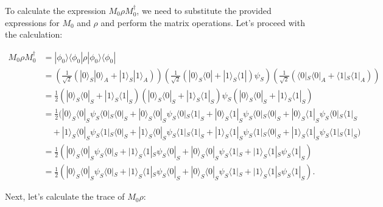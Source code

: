\documentclass{article}
\begin{document}
To calculate the expression $M_0\rho M_0^\dagger$, we need to substitute the provided expressions for $M_0$ and $\rho$ and perform the matrix operations. Let's proceed with the calculation:

\begin{align*}
    M_0\rho M_0^\dagger & = |\phi_0\rangle\langle\phi_0|\rho|\phi_0\rangle\langle\phi_0|                                                                                                                                                                                         \\
                        & = \left(\frac{1}{\sqrt{2}}(|0\rangle_S|0\rangle_A + |1\rangle_S|1\rangle_A)\right) \left(\frac{1}{\sqrt{2}}(|0\rangle_S\langle0| + |1\rangle_S\langle1|)\psi_S\right) \left(\frac{1}{\sqrt{2}}(\langle0|_S\langle0|_A + \langle1|_S\langle1|_A)\right) \\
                        & = \frac{1}{2}(|0\rangle_S\langle0|_S + |1\rangle_S\langle1|_S)(|0\rangle_S\langle0|_S + |1\rangle_S\langle1|_S)\psi_S(|0\rangle_S\langle0|_S + |1\rangle_S\langle1|_S)                                                                                 \\
                        & = \frac{1}{2}(|0\rangle_S\langle0|_S\psi_S\langle0|_S\langle0|_S + |0\rangle_S\langle0|_S\psi_S\langle0|_S\langle1|_S + |0\rangle_S\langle1|_S\psi_S\langle0|_S\langle0|_S + |0\rangle_S\langle1|_S\psi_S\langle0|_S\langle1|_S                        \\
                        & \quad + |1\rangle_S\langle0|_S\psi_S\langle1|_S\langle0|_S + |1\rangle_S\langle0|_S\psi_S\langle1|_S\langle1|_S + |1\rangle_S\langle1|_S\psi_S\langle1|_S\langle0|_S + |1\rangle_S\langle1|_S\psi_S\langle1|_S\langle1|_S)                             \\
                        & = \frac{1}{2}(|0\rangle_S\langle0|_S\psi_S\langle0|_S + |1\rangle_S\langle1|_S\psi_S\langle0|_S + |0\rangle_S\langle0|_S\psi_S\langle1|_S + |1\rangle_S\langle1|_S\psi_S\langle1|_S)                                                                   \\
                        & = \frac{1}{2}(|0\rangle_S\langle0|_S\psi_S\langle0|_S + |1\rangle_S\langle1|_S\psi_S\langle0|_S + |0\rangle_S\langle0|_S\psi_S\langle1|_S + |1\rangle_S\langle1|_S\psi_S\langle1|_S).
\end{align*}

Next, let's calculate the trace of $M_0\rho$:
\end{document}
